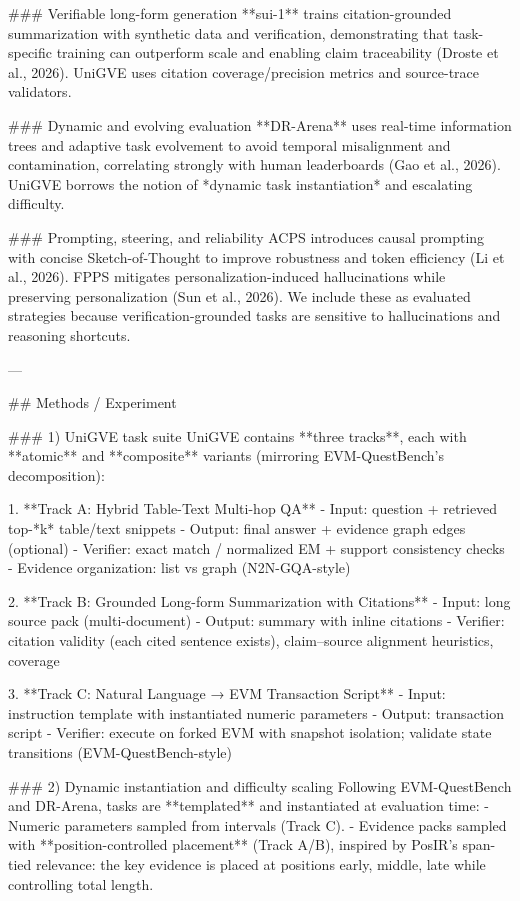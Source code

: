 ### Verifiable long-form generation  
**sui-1** trains citation-grounded summarization with synthetic data and verification, demonstrating that task-specific training can outperform scale and enabling claim traceability (Droste et al., 2026). UniGVE uses citation coverage/precision metrics and source-trace validators.

### Dynamic and evolving evaluation  
**DR-Arena** uses real-time information trees and adaptive task evolvement to avoid temporal misalignment and contamination, correlating strongly with human leaderboards (Gao et al., 2026). UniGVE borrows the notion of *dynamic task instantiation* and escalating difficulty.

### Prompting, steering, and reliability  
ACPS introduces causal prompting with concise Sketch-of-Thought to improve robustness and token efficiency (Li et al., 2026). FPPS mitigates personalization-induced hallucinations while preserving personalization (Sun et al., 2026). We include these as evaluated strategies because verification-grounded tasks are sensitive to hallucinations and reasoning shortcuts.

---

## Methods / Experiment  

### 1) UniGVE task suite  
UniGVE contains **three tracks**, each with **atomic** and **composite** variants (mirroring EVM-QuestBench’s decomposition):

1. **Track A: Hybrid Table-Text Multi-hop QA**  
   - Input: question + retrieved top-*k* table/text snippets  
   - Output: final answer + evidence graph edges (optional)  
   - Verifier: exact match / normalized EM + support consistency checks  
   - Evidence organization: list vs graph (N2N-GQA-style)

2. **Track B: Grounded Long-form Summarization with Citations**  
   - Input: long source pack (multi-document)  
   - Output: summary with inline citations  
   - Verifier: citation validity (each cited sentence exists), claim–source alignment heuristics, coverage

3. **Track C: Natural Language → EVM Transaction Script**  
   - Input: instruction template with instantiated numeric parameters  
   - Output: transaction script  
   - Verifier: execute on forked EVM with snapshot isolation; validate state transitions (EVM-QuestBench-style)

### 2) Dynamic instantiation and difficulty scaling  
Following EVM-QuestBench and DR-Arena, tasks are **templated** and instantiated at evaluation time:  
- Numeric parameters sampled from intervals (Track C).  
- Evidence packs sampled with **position-controlled placement** (Track A/B), inspired by PosIR’s span-tied relevance: the key evidence is placed at positions {early, middle, late} while controlling total length.

